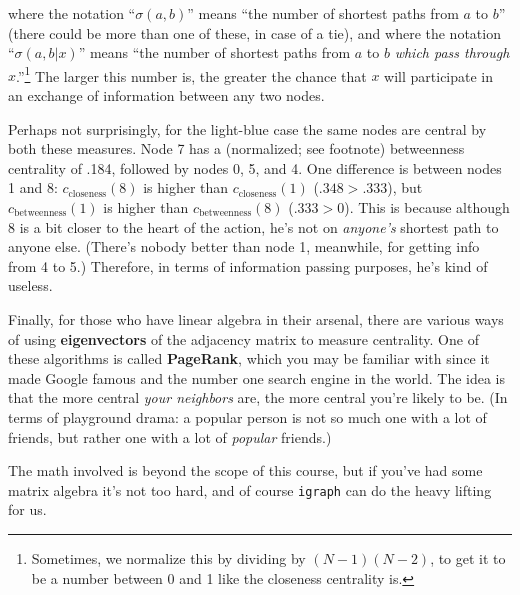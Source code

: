 where the notation ``$\sigma(a,b)$'' means ``the number of shortest paths from
$a$ to $b$'' (there could be more than one of these, in case of a tie), and
where the notation ``$\sigma(a,b|x)$'' means ``the number of shortest paths
from $a$ to $b$ \textit{which pass through $x$}.''\footnote{Sometimes, we
normalize this by dividing by $(N-1)(N-2)$, to get it to be a number between 0
and 1 like the closeness centrality is.} The larger this number is, the
greater the chance that $x$ will participate in an exchange of information
between any two nodes.


Perhaps not surprisingly, for the light-blue case the same nodes are central
by both these measures. Node 7 has a (normalized; see footnote) betweenness
centrality of .184, followed by nodes 0, 5, and 4. One difference is between
nodes 1 and 8: $c_{\textrm{closeness}}(8)$ is higher than
$c_{\textrm{closeness}}(1)$ ($.348 > .333$), but $c_{\textrm{betweenness}}(1)$
is higher than $c_{\textrm{betweenness}}(8)$ ($.333 > 0$). This is because
although 8 is a bit closer to the heart of the action, he's not on
\textit{anyone's} shortest path to anyone else. (There's nobody better than
node 1, meanwhile, for getting info from 4 to 5.) Therefore, in terms of
information passing purposes, he's kind of useless.


\vspace{.2in}

Finally, for those who have linear algebra in their arsenal, there are various
ways of using \textbf{eigenvectors} of the adjacency matrix to measure
centrality. One of these algorithms is called \textbf{PageRank}, which you may
be familiar with since it made Google famous and the number one search engine
in the world. The idea is that the more central \textit{your neighbors} are,
the more central you're likely to be. (In terms of playground drama: a popular
person is not so much one with a lot of friends, but rather one with a lot of
\textit{popular} friends.)

The math involved is beyond the scope of this course, but if you've had some
matrix algebra it's not too hard, and of course \texttt{igraph} can do the
heavy lifting for us.


